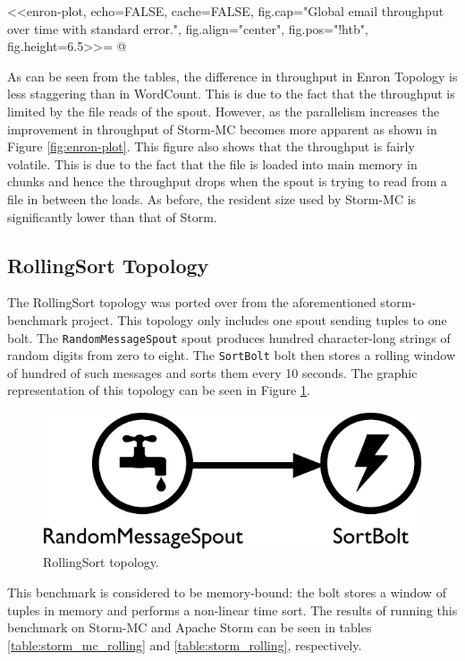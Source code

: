 <<enron-plot, echo=FALSE, cache=FALSE, fig.cap="Global email throughput over time with standard error.", fig.align="center", fig.pos="!htb", fig.height=6.5>>=
@

As can be seen from the tables, the difference in throughput in Enron Topology is less staggering than in WordCount. This is due to the fact that the throughput is limited by the file reads of the spout. However, as the parallelism increases the improvement in throughput of Storm-MC becomes more apparent as shown in Figure \ref{fig:enron-plot}. This figure also shows that the throughput is fairly volatile. This is due to the fact that the file is loaded into main memory in chunks and hence the throughput drops when the spout is trying to read from a file in between the loads. As before, the resident size used by Storm-MC is significantly lower than that of Storm.

\subsection{RollingSort Topology}

The RollingSort topology was ported over from the aforementioned storm-benchmark project. This topology only includes one spout sending tuples to one bolt. The \texttt{RandomMessageSpout} spout produces hundred character-long strings of random digits from zero to eight. The \texttt{SortBolt} bolt then stores a rolling window of hundred of such messages and sorts them every 10 seconds. The graphic representation of this topology can be seen in Figure \ref{fig:rolling_topology}.

\begin{figure}[!htb]
	\centering
	\includegraphics[scale=0.475]{pdf/rolling_topology.pdf}
	\caption{RollingSort topology.}
	\label{fig:rolling_topology}
\end{figure}

This benchmark is considered to be memory-bound: the bolt stores a window of tuples in memory and performs a non-linear time sort. The results of running this benchmark on Storm-MC and Apache Storm can be seen in tables \ref{table:storm_mc_rolling} and \ref{table:storm_rolling}, respectively.

